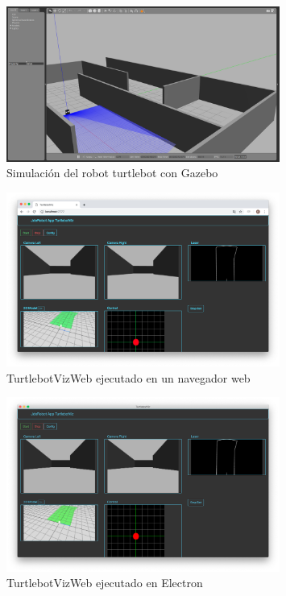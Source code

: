 \begin{figure}[H]
  \begin{center}
    \includegraphics[width=0.8\textwidth]{figures/gazeboturtle.png}
    		\caption{Simulación del robot turtlebot con Gazebo}
		\label{fig.gazeboturtle}
		\end{center}
\end{figure}
\begin{figure}[H]
  \begin{center}
    \includegraphics[width=0.8\textwidth]{figures/turtlebotviznode.png}
    		\caption{TurtlebotVizWeb ejecutado en un navegador web}
		\label{fig.turtlebotviznode}
		\end{center}
\end{figure}
\begin{figure}[H]
  \begin{center}
    \includegraphics[width=0.8\textwidth]{figures/turtlebotvizelectron.png}
    		\caption{TurtlebotVizWeb ejecutado en Electron}
		\label{fig.turtlebotvizelectron}
		\end{center}
\end{figure}

